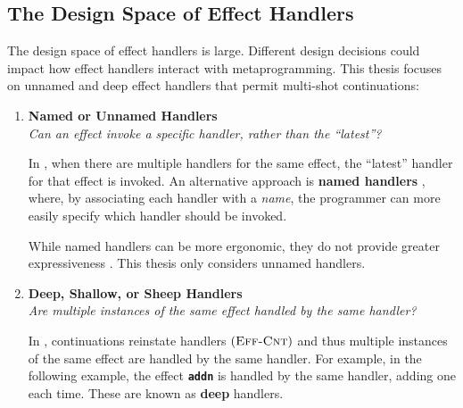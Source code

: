 \subsection{The Design Space of Effect Handlers}\label{subsection:effect-handler-design}
The design space of effect handlers is large. Different design decisions could impact how effect handlers interact with metaprogramming. This thesis focuses on unnamed and deep effect handlers that permit multi-shot continuations:

\renewcommand{\effconfiguration}[2]{{#1}; {#2}}
\renewcommand{\transition}[2]{#1 & \rightarrow & #2}
\newcommand{\rulename}[2]{(\textsc{{#1}-{#2}})}
\newcommand{\reductionRule}[1]{\rulename{Red}{#1}}
\newcommand{\congruenceRule}[1]{\rulename{Cng}{#1}}
\newcommand{\effectRule}[1]{\rulename{Eff}{#1}}

\begin{enumerate} 

 \item \textbf{\textsf{Named or Unnamed Handlers}}\\
        \textit{Can an effect invoke a specific handler, rather than the ``latest''?}
        
        In \efflang{}, when there are multiple handlers for the same effect, the ``latest'' handler for that effect is invoked. An alternative approach is \textbf{named handlers} \citep{xie-2022}, where, by associating each handler with a \textit{name}, the programmer can more easily specify which handler should be invoked. 

        While named handlers can be more ergonomic, they do not provide greater expressiveness \citep{xie-2022}. This thesis only considers unnamed handlers.

  \item \textbf{\textsf{Deep, Shallow, or Sheep Handlers}}\\
         \textit{Are multiple instances of the same effect handled by the same handler?}

         In \efflang{}, continuations reinstate handlers $\effectRule{Cnt}$ and thus multiple instances of the same effect are handled by the same handler. For example, in the following example, the effect \textbf{\texttt{addn}} is handled by the same handler, adding one each time. These are known as \textbf{deep} handlers.


\end{enumerate}
